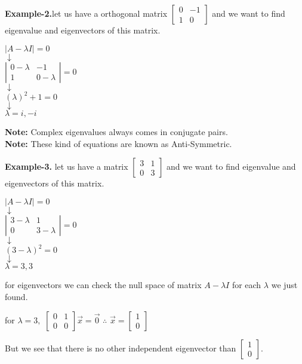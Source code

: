 \documentclass[a4paper,11pt]{article}
\numberwithin{equation}{section}
\begin{document}
\begin{itemize}
\textbf{Example-2.}let us have a orthogonal matrix $\begin{bmatrix}0&-1\\1&0\end{bmatrix}$ and we want to find eigenvalue and eigenvectors of this matrix.

\begin{center}
    $\left| A-\lambda I\right|=0$\\
    $\downarrow$\\
    $\left|\begin{matrix}
        0-\lambda&-1\\1&0-\lambda
    \end{matrix}\right|=0$\\
    $\downarrow$\\
    $(\lambda)^2+1=0$\\
    $\downarrow$\\
    $\lambda=i,-i$
\end{center}

\textbf{Note: }Complex eigenvalues always comes in conjugate pairs. \\
\textbf{Note: }These kind of equations are known as Anti-Symmetric.

\textbf{Example-3.} let us have a matrix $\begin{bmatrix}3&1\\0&3\end{bmatrix}$ and we want to find eigenvalue and eigenvectors of this matrix.

\begin{center}
    $\left| A-\lambda I\right|=0$\\
    $\downarrow$\\
    $\left|\begin{matrix}
        3-\lambda&1\\0&3-\lambda
    \end{matrix}\right|=0$\\
    $\downarrow$\\
    $(3-\lambda)^2=0$\\
    $\downarrow$\\
    $\lambda=3,3$
\end{center}

for eigenvectors we can check the null space of matrix $A-\lambda I$ for each $\lambda$ we just found.
\begin{center}
    for $\lambda =3,$ $\begin{bmatrix}
        0&1\\0&0
    \end{bmatrix}\vec{x}=\vec{0}$ \hspace{6pt} $\therefore$ $\vec{x}=\begin{bmatrix}
        1\\0
    \end{bmatrix}$
\end{center}
But we see that there is no other independent eigenvector than $\begin{bmatrix} 1\\0 \end{bmatrix}$.\\


\end{itemize}
\end{document}
